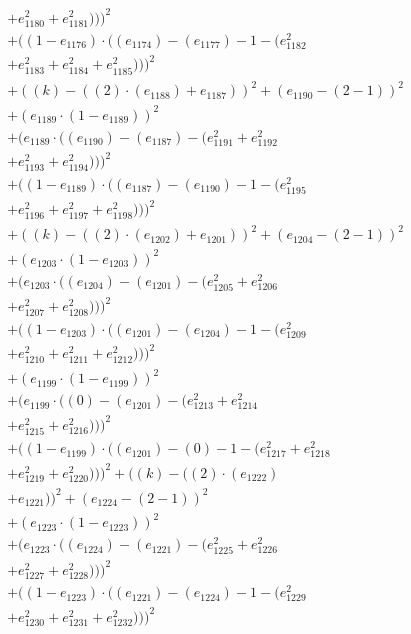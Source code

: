 \documentclass[10pt, a4paper]{article}
\begin{document}
\begin{small}
\begin{align*}
& + e_{1180}^{2} + e_{1181}^{2})))^{2} \\
& + ((1 - e_{1176})  \cdot  ((e_{1174}) - (e_{1177}) - 1 - (e_{1182}^{2} \\
& + e_{1183}^{2} + e_{1184}^{2} + e_{1185}^{2})))^{2} \\
& + ((k) - ((2)  \cdot  (e_{1188}) + e_{1187}))^{2} + (e_{1190} - (2 - 1))^{2} \\
& + (e_{1189}  \cdot  (1 - e_{1189}))^{2} \\
& + (e_{1189}  \cdot  ((e_{1190}) - (e_{1187}) - (e_{1191}^{2} + e_{1192}^{2} \\
& + e_{1193}^{2} + e_{1194}^{2})))^{2} \\
& + ((1 - e_{1189})  \cdot  ((e_{1187}) - (e_{1190}) - 1 - (e_{1195}^{2} \\
& + e_{1196}^{2} + e_{1197}^{2} + e_{1198}^{2})))^{2} \\
& + ((k) - ((2)  \cdot  (e_{1202}) + e_{1201}))^{2} + (e_{1204} - (2 - 1))^{2} \\
& + (e_{1203}  \cdot  (1 - e_{1203}))^{2} \\
& + (e_{1203}  \cdot  ((e_{1204}) - (e_{1201}) - (e_{1205}^{2} + e_{1206}^{2} \\
& + e_{1207}^{2} + e_{1208}^{2})))^{2} \\
& + ((1 - e_{1203})  \cdot  ((e_{1201}) - (e_{1204}) - 1 - (e_{1209}^{2} \\
& + e_{1210}^{2} + e_{1211}^{2} + e_{1212}^{2})))^{2} \\
& + (e_{1199}  \cdot  (1 - e_{1199}))^{2} \\
& + (e_{1199}  \cdot  ((0) - (e_{1201}) - (e_{1213}^{2} + e_{1214}^{2} \\
& + e_{1215}^{2} + e_{1216}^{2})))^{2} \\
& + ((1 - e_{1199})  \cdot  ((e_{1201}) - (0) - 1 - (e_{1217}^{2} + e_{1218}^{2} \\
& + e_{1219}^{2} + e_{1220}^{2})))^{2} + ((k) - ((2)  \cdot  (e_{1222}) \\
& + e_{1221}))^{2} + (e_{1224} - (2 - 1))^{2} \\
& + (e_{1223}  \cdot  (1 - e_{1223}))^{2} \\
& + (e_{1223}  \cdot  ((e_{1224}) - (e_{1221}) - (e_{1225}^{2} + e_{1226}^{2} \\
& + e_{1227}^{2} + e_{1228}^{2})))^{2} \\
& + ((1 - e_{1223})  \cdot  ((e_{1221}) - (e_{1224}) - 1 - (e_{1229}^{2} \\
& + e_{1230}^{2} + e_{1231}^{2} + e_{1232}^{2})))^{2} \\

\end{align*}
\end{small}
\end{document}
